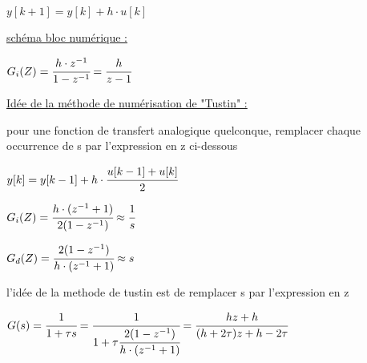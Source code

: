 \vspace{-3mm}


\vspace{3mm}
{\hfill $y[k+1] = y[k] + h \cdot u[k]$\hfill} 

\vspace{3mm}

\underline{schéma bloc numérique :}   

\begin{center}
    $G_i(Z) = \cfrac{h \cdot z^{-1}}{1 - z^{-1}}= \cfrac{h}{z-1}$
\end{center}

\newpage


\underline{Idée de la méthode de numérisation de "Tustin" :}

pour une fonction de transfert analogique quelconque, 
remplacer chaque occurrence de s par l'expression en z ci-dessous

\vspace{3mm}

$y[k] = y[k-1] + h \cdot \cfrac{u[k-1]+u[k]}{2}$

\vspace{3mm}

$G_i(Z) = \cfrac{h \cdot (z^{-1}+1)}{2(1 - z^{-1})} \approx \cfrac{1}{s}$


$G_d(Z) = \cfrac{2(1 - z^{-1})}{h \cdot (z^{-1}+1)} \approx s$

l'idée de la methode de tustin est de remplacer s par l'expression en z

{\footnotesize $G(s) = \cfrac{1}{1+ \tau s} = \cfrac{1}{1+ \tau \cfrac{2(1 - z^{-1})}{h \cdot (z^{-1}+1)}} = \cfrac{hz + h}{(h+2\tau)z + h -2\tau}$}


